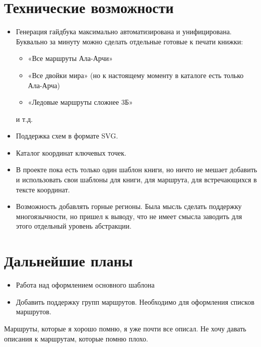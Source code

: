 \documentclass[11pt,fleqn]{report} %
\begin{document}
\section{Технические возможности}

\begin{itemize}

\item Генерация гайдбука максимально автоматизирована и унифицирована.
  Буквально за минуту можно сделать отдельные готовые к печати книжки:

  \begin{itemize}
  \item «Все маршруты Ала-Арчи»
  \item «Все двойки мира» (но к настоящему моменту в каталоге есть
    только Ала-Арча)
  \item «Ледовые маршруты сложнее 3Б»
  \end{itemize}
  и т.д.

\item Поддержка схем в формате SVG.
  
\item Каталог координат ключевых точек.

\item В проекте пока есть только один шаблон книги, но ничто не мешает
  добавить и использовать свои шаблоны для книги, для маршрута, для
  встречающихся в тексте координат.

\item Возможность добавлять горные регионы. Была мысль сделать
  поддержку многоязычности, но пришел к выводу, что не имеет смысла
  заводить для этого отдельный уровень абстракции.
  
\end{itemize}

\section{Дальнейшие планы}

\begin{itemize}
\item Работа над оформлением основного шаблона
\item Добавить поддержку групп маршрутов. Необходимо для оформления
  списков маршрутов.
\end{itemize}

Маршруты, которые я хорошо помню, я уже почти все описал. Не хочу
давать описания к маршрутам, которые помню плохо.
\end{document}
